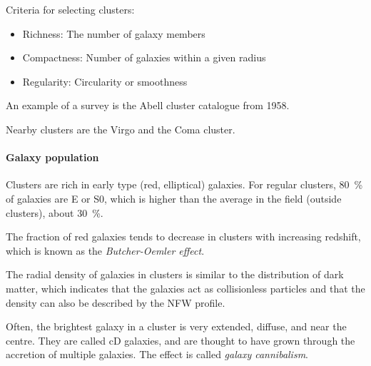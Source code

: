 Criteria for selecting clusters:
\begin{itemize}
	\item Richness: The number of galaxy members
	\item Compactness: Number of galaxies within a given radius
	\item Regularity: Circularity or smoothness
\end{itemize}

An example of a survey is the Abell cluster catalogue from 1958.

Nearby clusters are the Virgo and the Coma cluster.

\paragraph*{Galaxy population}
Clusters are rich in early type (red, elliptical) galaxies.
For regular clusters, \SI{80}{\percent} of galaxies are E or S0, which is higher than the average in the field (outside clusters), about \SI{30}{\percent}.

The fraction of red galaxies tends to decrease in clusters with increasing redshift, which is known as the \emph{Butcher-Oemler effect}.

The radial density of galaxies in clusters is similar to the distribution of dark matter, which indicates that the galaxies act as collisionless particles and that the density can also be described by the NFW profile.

Often, the brightest galaxy in a cluster is very extended, diffuse, and near the centre. They are called cD galaxies, and are thought to have grown through the accretion of multiple galaxies.
The effect is called \emph{galaxy cannibalism}.

